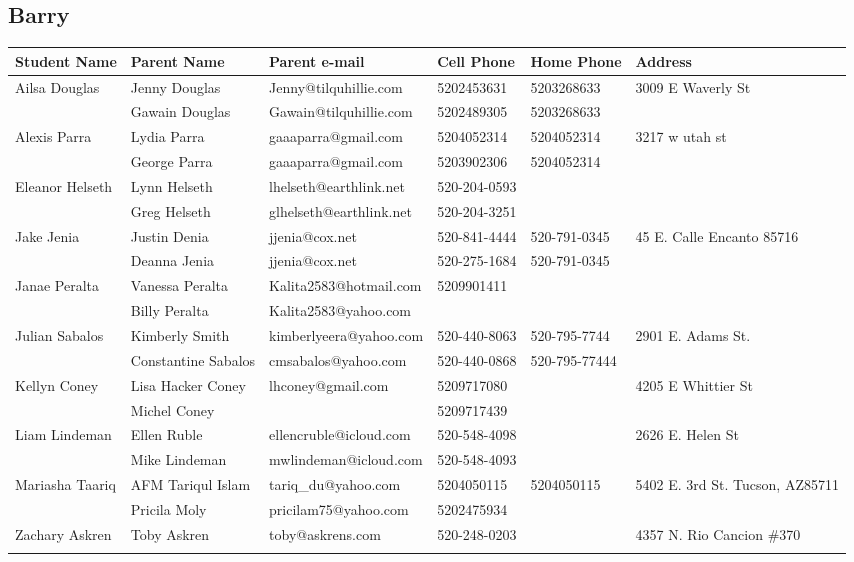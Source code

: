 \documentclass[landscape]{article}\usepackage[]{graphicx}\usepackage[]{color}
\begin{document}
\subsection{Barry}
\begin{longtable}{|p{100pt}|p{100pt}|p{140pt}|p{60pt}|p{64pt}|p{120pt}|}
\textbf{Student Name} & \textbf{Parent Name} & \textbf{Parent e-mail} & \textbf{Cell Phone} & \textbf{Home Phone} & \textbf{Address}\\
\hline
\hline
\multirow{2}{100pt}{Ailsa Douglas} & Jenny Douglas & Jenny@tilquhillie.com & 5202453631 & 5203268633 & \multirow{2}{120pt}{3009 E Waverly St} \\
 & Gawain Douglas & Gawain@tilquhillie.com & 5202489305 & 5203268633 & \\
\hline
\multirow{2}{100pt}{Alexis Parra} & Lydia Parra & gaaaparra@gmail.com & 5204052314 & 5204052314 & \multirow{2}{120pt}{3217 w utah st} \\
 & George Parra & gaaaparra@gmail.com & 5203902306 & 5204052314 & \\
\hline
\multirow{2}{100pt}{Eleanor Helseth} & Lynn Helseth & lhelseth@earthlink.net & 520-204-0593 &  & \multirow{2}{120pt}{} \\
 & Greg Helseth & glhelseth@earthlink.net & 520-204-3251 &  & \\
\hline
\multirow{2}{100pt}{Jake Jenia} & Justin Denia & jjenia@cox.net & 520-841-4444 & 520-791-0345 & \multirow{2}{120pt}{45 E. Calle Encanto 85716} \\
 & Deanna Jenia & jjenia@cox.net & 520-275-1684 & 520-791-0345 & \\
\hline
\multirow{2}{100pt}{Janae Peralta} & Vanessa Peralta  & Kalita2583@hotmail.com & 5209901411 &  & \multirow{2}{120pt}{} \\
 & Billy Peralta & Kalita2583@yahoo.com &  &  & \\
\hline
\multirow{2}{100pt}{Julian Sabalos} & Kimberly Smith & kimberlyeera@yahoo.com & 520-440-8063 & 520-795-7744 & \multirow{2}{120pt}{2901 E. Adams St.} \\
 & Constantine Sabalos & cmsabalos@yahoo.com & 520-440-0868 & 520-795-77444 & \\
\hline
\multirow{2}{100pt}{Kellyn Coney} & Lisa Hacker Coney & lhconey@gmail.com & 5209717080 &  & \multirow{2}{120pt}{4205 E Whittier St} \\
 & Michel Coney &  & 5209717439 &  & \\
\hline
\multirow{2}{100pt}{Liam Lindeman} & Ellen Ruble & ellencruble@icloud.com & 520-548-4098 &  & \multirow{2}{120pt}{2626 E. Helen St} \\
 & Mike Lindeman & mwlindeman@icloud.com & 520-548-4093 &  & \\
\hline
\multirow{2}{100pt}{Mariasha Taariq} & AFM Tariqul Islam & tariq\_du@yahoo.com & 5204050115 & 5204050115 & \multirow{2}{120pt}{5402 E. 3rd St. Tucson, AZ85711} \\
 & Pricila Moly & pricilam75@yahoo.com & 5202475934 &  & \\
\hline
\multirow{2}{100pt}{Zachary Askren} & Toby Askren & toby@askrens.com & 520-248-0203 &  & \multirow{2}{120pt}{4357 N. Rio Cancion \#370} \\
 &  &  &  &  & \\
\hline
\end{longtable}
\end{document}
